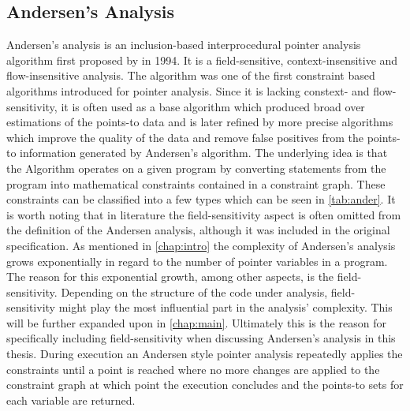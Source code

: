 \subsection{Andersen's Analysis}\label{sec:ander}
Andersen's analysis is an inclusion-based interprocedural pointer analysis algorithm first proposed by \cite{andersen1994program} in 1994. It is a field-sensitive, context-insensitive and flow-insensitive analysis. 
The algorithm was one of the first constraint based algorithms introduced for pointer analysis. Since it is lacking constext- and flow-sensitivity, it is often used as a base algorithm which produced broad over estimations of the points-to data and is later refined by more precise algorithms which improve the quality of the data and remove false positives from the points-to information generated by Andersen's algorithm.
The underlying idea is that the Algorithm operates on a given program by converting statements from the program into mathematical constraints contained in a constraint graph.
These constraints can be classified into a few types which can be seen in \autoref{tab:ander}.
It is worth noting that in literature the field-sensitivity aspect is often omitted from the definition of the Andersen analysis, although it was included in the original specification.
As mentioned in \autoref{chap:intro} the complexity of Andersen's analysis grows exponentially in regard to the number of pointer variables in a program. The reason for this exponential growth, among other aspects, is the field-sensitivity. Depending on the structure of the code under analysis, field-sensitivity might play the most influential part in the analysis' complexity. This will be further expanded upon in \autoref{chap:main}. Ultimately this is the reason for specifically including field-sensitivity when discussing Andersen's analysis in this thesis.
During execution an Andersen style pointer analysis repeatedly applies the constraints until a point is reached where no more changes are applied to the constraint graph at which point the execution concludes and the points-to sets for each variable are returned.
